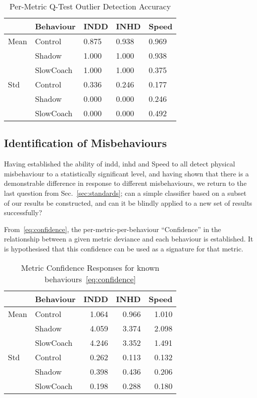 \begin{table}
  \caption{Per-Metric Q-Test Outlier Detection Accuracy}
  \centering
\begin{tabular}{lllll}
\toprule
{} & Behaviour &  INDD &  INHD & Speed \\
\midrule
Mean & Control & 0.875 & 0.938 & 0.969 \\
     & Shadow & 1.000 & 1.000 & 0.938 \\
     & SlowCoach & 1.000 & 1.000 & 0.375 \\
Std & Control & 0.336 & 0.246 & 0.177 \\
     & Shadow & 0.000 & 0.000 & 0.246 \\
     & SlowCoach & 0.000 & 0.000 & 0.492 \\
\bottomrule
\end{tabular}
  \label{tab:per_metric_stats}
\end{table}

\subsection{Identification of Misbehaviours}
Having established the ability of \gls{indd}, \gls{inhd} and Speed to all detect physical misbehaviour to a statistically significant level, and having shown that there is a demonstrable difference in response to different misbehaviours, we return to the last question from Sec.~\ref{sec:standards}; can a simple classifier based on a subset of our results be constructed, and can it be blindly applied to a new set of results successfully?

From~\eqref{eq:confidence}, the per-metric-per-behaviour ``Confidence'' in the relationship between a given metric deviance and each behaviour is established. It is hypothesised that this confidence can be used as a signature for that metric.


\begin{table}[h]
  \caption{Metric Confidence Responses for known behaviours~\eqref{eq:confidence}}
  \centering
\begin{tabular}{llrrr}
\toprule
{} & Behaviour &  INDD &  INHD &  Speed \\
\midrule
Mean & Control & 1.064 & 0.966 &  1.010 \\
     & Shadow & 4.059 & 3.374 &  2.098 \\
     & SlowCoach & 4.246 & 3.352 &  1.491 \\
Std & Control & 0.262 & 0.113 &  0.132 \\
     & Shadow & 0.398 & 0.436 &  0.206 \\
     & SlowCoach & 0.198 & 0.288 &  0.180 \\
\bottomrule
\end{tabular}
  \label{tab:confidence}
\end{table}

